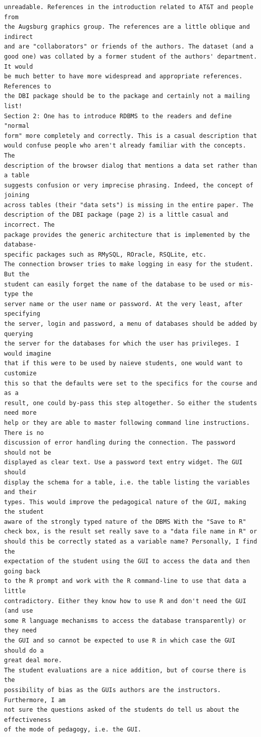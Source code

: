 \documentclass[11pt]{tise_style}
\begin{document}
\begin{verbatim}
unreadable. References in the introduction related to AT&T and people from
the Augsburg graphics group. The references are a little oblique and indirect
and are "collaborators" or friends of the authors. The dataset (and a
good one) was collated by a former student of the authors' department. It would
be much better to have more widespread and appropriate references. References to
the DBI package should be to the package and certainly not a mailing list!
Section 2: One has to introduce RDBMS to the readers and define "normal
form" more completely and correctly. This is a casual description that
would confuse people who aren't already familiar with the concepts. The
description of the browser dialog that mentions a data set rather than a table
suggests confusion or very imprecise phrasing. Indeed, the concept of joining
across tables (their "data sets") is missing in the entire paper. The
description of the DBI package (page 2) is a little casual and incorrect. The
package provides the generic architecture that is implemented by the database-
specific packages such as RMySQL, ROracle, RSQLite, etc.
The connection browser tries to make logging in easy for the student. But the
student can easily forget the name of the database to be used or mis-type the
server name or the user name or password. At the very least, after specifying
the server, login and password, a menu of databases should be added by querying
the server for the databases for which the user has privileges. I would imagine
that if this were to be used by naieve students, one would want to customize
this so that the defaults were set to the specifics for the course and as a
result, one could by-pass this step altogether. So either the students need more
help or they are able to master following command line instructions. There is no
discussion of error handling during the connection. The password should not be
displayed as clear text. Use a password text entry widget. The GUI should
display the schema for a table, i.e. the table listing the variables and their
types. This would improve the pedagogical nature of the GUI, making the student
aware of the strongly typed nature of the DBMS With the "Save to R"
check box, is the result set really save to a "data file name in R" or
should this be correctly stated as a variable name? Personally, I find the
expectation of the student using the GUI to access the data and then going back
to the R prompt and work with the R command-line to use that data a little
contradictory. Either they know how to use R and don't need the GUI (and use
some R language mechanisms to access the database transparently) or they need
the GUI and so cannot be expected to use R in which case the GUI should do a
great deal more.
The student evaluations are a nice addition, but of course there is the
possibility of bias as the GUIs authors are the instructors. Furthermore, I am
not sure the questions asked of the students do tell us about the effectiveness
of the mode of pedagogy, i.e. the GUI.
\end{verbatim}
\end{document}
